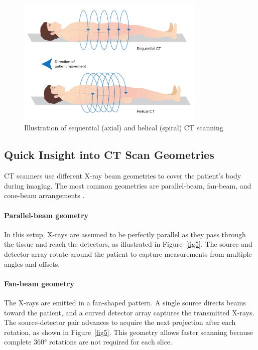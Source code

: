 \documentclass[12pt,a4paper]{article}
\begin{document}
\begin{figure}[H]
    \centering
    \includegraphics[width=0.8\textwidth]{Bachelorthesis/UsedImages/fig3.png}
    \caption{Illustration of sequential (axial) and helical (spiral) CT scanning~\cite{lecturio_ct_2025}}
    \label{fig3}
\end{figure}


\subsection{Quick Insight into CT Scan Geometries}
\label{ct_scan_geometries}

CT scanners use different X-ray beam geometries to cover the patient’s body during imaging. The most common geometries are parallel-beam, fan-beam, and cone-beam arrangements \cite{nett2019ctgenerations}.

\paragraph{Parallel-beam geometry}
In this setup, X-rays are assumed to be perfectly parallel as they pass through the tissue and reach the detectors, as illustrated in Figure~\ref{fig5}. The source and detector array rotate around the patient to capture measurements from multiple angles and offsets.

\paragraph{Fan-beam geometry}
The X-rays are emitted in a fan-shaped pattern. A single source directs beams toward the patient, and a curved detector array captures the transmitted X-rays. The source-detector pair advances to acquire the next projection after each rotation, as shown in Figure~\ref{fig5}. This geometry allows faster scanning because complete 360° rotations are not required for each slice.
\end{document}
